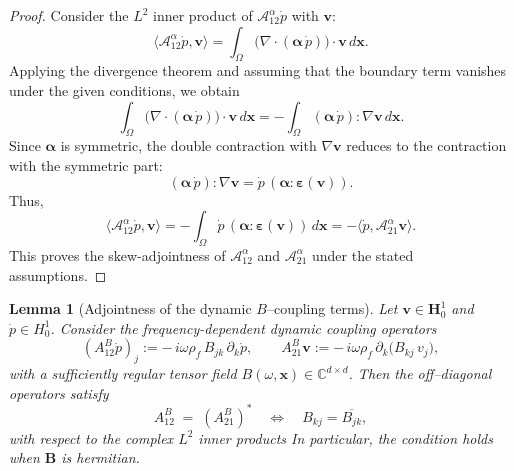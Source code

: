 \documentclass[pdflatex,sn-mathphys-num]{sn-jnl}
\theoremstyle{thmstyleone}%
\theoremstyle{thmstyletwo}%
\theoremstyle{thmstylethree}%
\def \bmv {\bm{v}}
\newtheorem{lemma}[theorem]{Lemma}
\theoremstyle{definition}
\begin{document}
	\begin{proof}
		Consider the $L^2$ inner product of $\mathcal{A}_{12}^{\alpha}\dot{p}$ with $\mathbf{v}$:
		\[
		\langle \mathcal{A}_{12}^{\alpha}\dot{p}, \mathbf{v} \rangle
		= \int_{\Omega} \big( \nabla \cdot (\boldsymbol{\alpha}\,\dot{p}) \big) \cdot \mathbf{v}\, d\bm{x}.
		\]
		Applying the divergence theorem and assuming that the boundary term vanishes under the given conditions, we obtain
		\[
		\int_{\Omega} \big( \nabla \cdot (\boldsymbol{\alpha}\,\dot{p}) \big) \cdot \mathbf{v}\, d\bm{x}
		= - \int_{\Omega} (\boldsymbol{\alpha}\,\dot{p}) : \nabla \mathbf{v}\, d\bm{x}.
		\]
		Since $\boldsymbol{\alpha}$ is symmetric, the double contraction with $\nabla \mathbf{v}$ reduces to the contraction with the symmetric part:
		\[
		(\boldsymbol{\alpha}\,\dot{p}) : \nabla \mathbf{v} = \dot{p}\, (\boldsymbol{\alpha} : \boldsymbol{\varepsilon}(\mathbf{v})).
		\]
		Thus,
		\[
		\langle \mathcal{A}_{12}^{\alpha}\dot{p}, \mathbf{v} \rangle
		= - \int_{\Omega} \dot{p}\, (\boldsymbol{\alpha} : \boldsymbol{\varepsilon}(\mathbf{v}))\, d\bm{x}
		= - \langle \dot{p}, \mathcal{A}_{21}^{\alpha}\mathbf{v} \rangle.
		\]
		This proves the skew-adjointness of $\mathcal{A}_{12}^{\alpha}$ and $\mathcal{A}_{21}^{\alpha}$ under the stated assumptions.
	\end{proof}
	
	
	
	
	\begin{lemma}[Adjointness of the dynamic $B$--coupling terms]
		Let $\bmv\in \bm{H}_{0}^{1}$ and $\dot{p}\in H^{1}_{0}$. Consider the frequency-dependent dynamic coupling operators
		\[
		(A_{12}^B \dot p)_j := -\,i\omega \rho_f\, B_{j k}\,\partial_k \dot p,
		\qquad
		A_{21}^B \mathbf{v} := -\,i\omega \rho_f\, \partial_k\!\big(B_{k j}\,v_j\big),
		\]
		with a sufficiently regular tensor field $B(\omega,\mathbf{x})\in\mathbb{C}^{d\times d}$.
		Then the off--diagonal operators satisfy
		\[
		A_{12}^B \;=\; (A_{21}^B)^{*}
		\quad\Longleftrightarrow\quad
		B_{k j} = \overline{B_{j k}},
		\]
		with respect to the complex $L^2$ inner products
		In particular, the condition holds when $\bm{B}$ is hermitian.
	\end{lemma}
	
\end{document}
